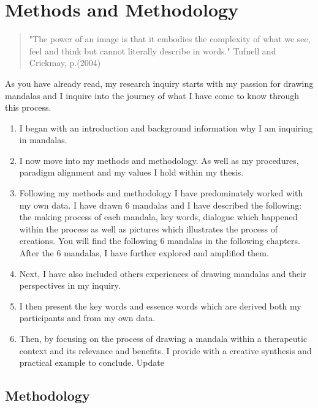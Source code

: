 \newpage
\chapter{Methods and Methodology}

\newpage




\begin{quote}
"The power of an image is that it embodies the complexity of what we see, feel and think but cannot literally describe in words." Tufnell and Crickmay, p.(2004)
\end{quote}


As you have already read, my research inquiry starts with my passion for drawing mandalas and I inquire into the journey of what I have come to know through this process. 
\begin{enumerate}
\item I began with an introduction and background information why I am inquiring in mandalas.  
\item I now move into my methods and methodology. As well as my procedures, paradigm alignment and my values I hold within my thesis. 
\item 
Following my methods and methodology I have predominately worked with my own data. I have drawn 6 mandalas and I have described the following: the making process of each mandala, key words, dialogue which happened within the process as well as pictures which illustrates the process of creations. You will find the following 6 mandalas in the following chapters. After the 6 mandalas, I have further explored and amplified them. 
\item 
Next, I have also included others experiences of drawing mandalas and their perspectives in my inquiry.
\item 
I then present the key words and essence words which are derived both my participants and from my own data. 
\item 
Then, by focusing on the process of drawing a mandala within a therapeutic context and its relevance and benefits. I provide with a creative synthesis and practical example to conclude.
Update 
\end{enumerate}

\section{Methodology}

